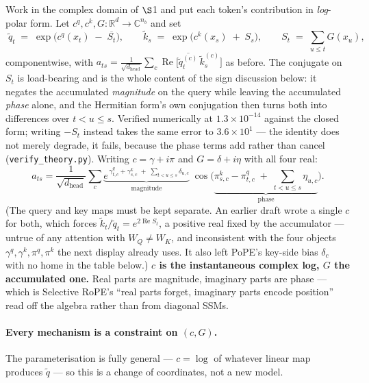 \documentclass[11pt]{article}
\newcommand{\R}{\mathbb{R}}
\newcommand{\C}{\mathbb{C}}
\newcommand{\hd}{d_{\mathrm{head}}}
\newcommand{\nb}{n_b}
\begin{document}
Work in the complex domain of $\S$1 and put each token's contribution in
\emph{log}-polar form. Let $c^q,c^k,G:\R^d\to\C^{\nb}$ and set
\begin{equation}
  \label{eq:unified}
  \boxed{\;
  \tilde q_t \;=\; \exp\!\Big(c^q(x_t) \;-\; \overline{S_t}\Big),
  \qquad
  \tilde k_s \;=\; \exp\!\Big(c^k(x_s) \;+\; S_s\Big),
  \qquad
  S_t \;=\; \textstyle\sum_{u\le t} G(x_u),}
\end{equation}
componentwise, with $a_{ts} = \tfrac{1}{\sqrt{\hd}}\sum_c
\operatorname{Re}\big[\overline{\tilde q_t^{(c)}}\,\tilde k_s^{(c)}\big]$ as
before. The conjugate on $S_t$ is load-bearing and is the whole content of the
sign discussion below: it negates the accumulated \emph{magnitude} on the query
while leaving the accumulated \emph{phase} alone, and the Hermitian form's own
conjugation then turns both into differences over $t<u\le s$. Verified
numerically at $1.3\times10^{-14}$ against the closed form; writing $-S_t$ instead
takes the same error to $3.6\times10^{1}$ --- the identity does not merely degrade,
it fails, because the phase terms add rather than cancel
(\texttt{verify\_theory.py}). Writing $c = \gamma + i\pi$ and $G = \delta + i\eta$ with all four real:
\begin{equation}
  a_{ts} = \frac{1}{\sqrt{\hd}}\sum_c
  \underbrace{e^{\,\gamma^q_{t,c}+\gamma^k_{s,c}
        \;+\;\sum_{t<u\le s}\delta_{u,c}}}_{\text{magnitude}}
  \;
  \cos\Big(\underbrace{\pi^k_{s,c}-\pi^q_{t,c}
        \;+\;\textstyle\sum_{t<u\le s}\eta_{u,c}}_{\text{phase}}\Big).
\end{equation}
(The query and key maps must be kept separate. An earlier draft wrote a single
$c$ for both, which forces $\tilde k_t/\tilde q_t = e^{2\operatorname{Re}S_t}$, a
positive real fixed by the accumulator --- untrue of any attention with
$W_Q\neq W_K$, and inconsistent with the four objects
$\gamma^q,\gamma^k,\pi^q,\pi^k$ the next display already uses. It also left PoPE's
key-side bias $\delta_c$ with no home in the table below.)
\textbf{$c$ is the instantaneous complex log, $G$ the accumulated one.} Real parts
are magnitude, imaginary parts are phase --- which is Selective RoPE's ``real
parts forget, imaginary parts encode position'' read off the algebra rather than
from diagonal SSMs.

\paragraph{Every mechanism is a constraint on $(c,G)$.} The parameterisation is
fully general --- $c = \log$ of whatever linear map produces $\tilde q$ --- so
this is a change of coordinates, not a new model.
\end{document}
